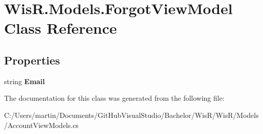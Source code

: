 \hypertarget{class_wis_r_1_1_models_1_1_forgot_view_model}{}\section{Wis\+R.\+Models.\+Forgot\+View\+Model Class Reference}
\label{class_wis_r_1_1_models_1_1_forgot_view_model}
\subsection*{Properties}
\begin{DoxyCompactItemize}
\item 
\hypertarget{class_wis_r_1_1_models_1_1_forgot_view_model_a97d6b953520f9b597f93ad546e9c231b}{}string {\bfseries Email}\label{class_wis_r_1_1_models_1_1_forgot_view_model_a97d6b953520f9b597f93ad546e9c231b}

\end{DoxyCompactItemize}


The documentation for this class was generated from the following file\+:\begin{DoxyCompactItemize}
\item 
C\+:/\+Users/martin/\+Documents/\+Git\+Hub\+Visual\+Studio/\+Bachelor/\+Wis\+R/\+Wis\+R/\+Models/Account\+View\+Models.\+cs\end{DoxyCompactItemize}
